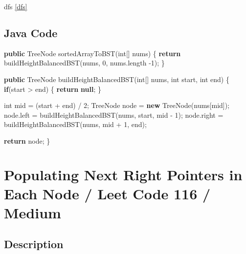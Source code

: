 \documentclass[]{book}
\newenvironment{Shaded}{\begin{snugshade}}{\end{snugshade}}
\newcommand{\BuiltInTok}[1]{#1}
\newcommand{\DataTypeTok}[1]{\textcolor[rgb]{0.13,0.29,0.53}{#1}}
\newcommand{\DecValTok}[1]{\textcolor[rgb]{0.00,0.00,0.81}{#1}}
\newcommand{\FunctionTok}[1]{\textcolor[rgb]{0.00,0.00,0.00}{#1}}
\newcommand{\KeywordTok}[1]{\textcolor[rgb]{0.13,0.29,0.53}{\textbf{#1}}}
\newcommand{\NormalTok}[1]{#1}
\begin{document}
dfs \ref{dfs}

\hypertarget{java-code-58}{%
\subsection{Java Code}\label{java-code-58}}

\begin{Shaded}
\begin{Highlighting}[]
\KeywordTok{public} \BuiltInTok{TreeNode} \FunctionTok{sortedArrayToBST}\NormalTok{(}\DataTypeTok{int}\NormalTok{[] nums) \{}
    \KeywordTok{return} \FunctionTok{buildHeightBalancedBST}\NormalTok{(nums, }\DecValTok{0}\NormalTok{, nums.}\FunctionTok{length} \DecValTok{-1}\NormalTok{);}
\NormalTok{\}}

\KeywordTok{public} \BuiltInTok{TreeNode} \FunctionTok{buildHeightBalancedBST}\NormalTok{(}\DataTypeTok{int}\NormalTok{[] nums, }\DataTypeTok{int}\NormalTok{ start, }\DataTypeTok{int}\NormalTok{ end) \{}
    \KeywordTok{if}\NormalTok{(start > end) \{}
        \KeywordTok{return} \KeywordTok{null}\NormalTok{;}
\NormalTok{    \}}

    \DataTypeTok{int}\NormalTok{ mid = (start + end) / }\DecValTok{2}\NormalTok{;}
    \BuiltInTok{TreeNode}\NormalTok{ node = }\KeywordTok{new} \BuiltInTok{TreeNode}\NormalTok{(nums[mid]);}
\NormalTok{    node.}\FunctionTok{left}\NormalTok{ = }\FunctionTok{buildHeightBalancedBST}\NormalTok{(nums, start, mid - }\DecValTok{1}\NormalTok{);}
\NormalTok{    node.}\FunctionTok{right}\NormalTok{ = }\FunctionTok{buildHeightBalancedBST}\NormalTok{(nums, mid + }\DecValTok{1}\NormalTok{, end);}

    \KeywordTok{return}\NormalTok{ node;}
\NormalTok{\}}
\end{Highlighting}
\end{Shaded}

\hypertarget{populating-next-right-pointers-in-each-node-leet-code-116-medium}{%
\section{Populating Next Right Pointers in Each Node / Leet Code 116 / Medium}\label{populating-next-right-pointers-in-each-node-leet-code-116-medium}}

\hypertarget{description-78}{%
\subsection{Description}\label{description-78}}
\end{document}
